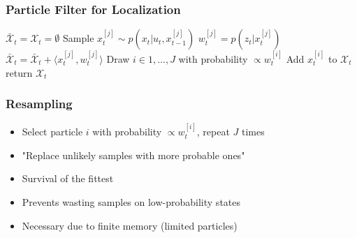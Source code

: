 \begin{frame}
    \frametitle{Particle Filter for Localization}

    \begin{algorithmic}[1]
        \State $\bar{\mathcal{X}}_t = \mathcal{X}_t = \emptyset$
            \State Sample $x_t^{[j]} \sim p(x_t | u_t, x_{t-1}^{[j]})$
            \State $w_t^{[j]} = p(z_t | x_t^{[j]})$
            \State $\bar{\mathcal{X}}_t = \bar{\mathcal{X}}_t + \langle x_t^{[j]}, w_t^{[j]}\rangle$
        \EndFor
            \State Draw $i \in 1,\ldots,J$ with probability $\propto w_t^{[i]}$
            \State Add $x_t^{[i]}$ to $\mathcal{X}_t$
        \EndFor
        \State return $\mathcal{X}_t$
    \EndProcedure
    \end{algorithmic}
\end{frame}

\begin{frame}
    \frametitle{Resampling}

    \begin{itemize}
        \item Select particle $i$ with probability $\propto w_t^{[i]}$, repeat $J$ times
        \item "Replace unlikely samples with more probable ones"
        \item Survival of the fittest
        \item Prevents wasting samples on low-probability states
        \item Necessary due to finite memory (limited particles)
    \end{itemize}
\end{frame}

